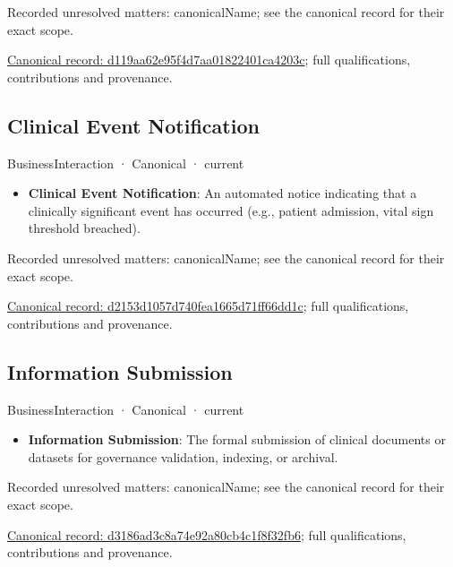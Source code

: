 {\small Recorded unresolved matters: canonicalName; see the canonical record for their exact scope.}\par
{\footnotesize \href{../../../../continuum/business/business-interaction/d119aa62e95f4d7aa01822401ca4203c.md}{Canonical record: d119aa62e95f4d7aa01822401ca4203c}; full qualifications, contributions and provenance.}\par
\subsection{Clinical Event Notification}

\label{element:d2153d1057d740fea1665d71ff66dd1c}
{\small BusinessInteraction · Canonical · current}\par

\begin{itemize}


\item \textbf{Clinical Event Notification}: An automated notice indicating that a clinically significant event has occurred (e.g., patient admission, vital sign threshold breached).

\end{itemize}

{\small Recorded unresolved matters: canonicalName; see the canonical record for their exact scope.}\par
{\footnotesize \href{../../../../continuum/business/business-interaction/d2153d1057d740fea1665d71ff66dd1c.md}{Canonical record: d2153d1057d740fea1665d71ff66dd1c}; full qualifications, contributions and provenance.}\par
\subsection{Information Submission}

\label{element:d3186ad3c8a74e92a80cb4c1f8f32fb6}
{\small BusinessInteraction · Canonical · current}\par

\begin{itemize}


\item \textbf{Information Submission}: The formal submission of clinical documents or datasets for governance validation, indexing, or archival.

\end{itemize}

{\small Recorded unresolved matters: canonicalName; see the canonical record for their exact scope.}\par
{\footnotesize \href{../../../../continuum/business/business-interaction/d3186ad3c8a74e92a80cb4c1f8f32fb6.md}{Canonical record: d3186ad3c8a74e92a80cb4c1f8f32fb6}; full qualifications, contributions and provenance.}\par
